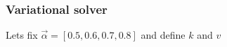 \documentclass[11pt]{article}
\begin{document}
    \begin{center}
    \end{center}
    { \hspace*{\fill} \\}
    
    \begin{center}
    \end{center}
    { \hspace*{\fill} \\}
    
    \begin{center}
    \end{center}
    { \hspace*{\fill} \\}
    
    \subsubsection{Variational solver}\label{variational-solver}

    Lets fix \(\overrightarrow\alpha = [0.5, 0.6, 0.7, 0.8]\) and define
\(k\) and \(v\)
\end{document}
